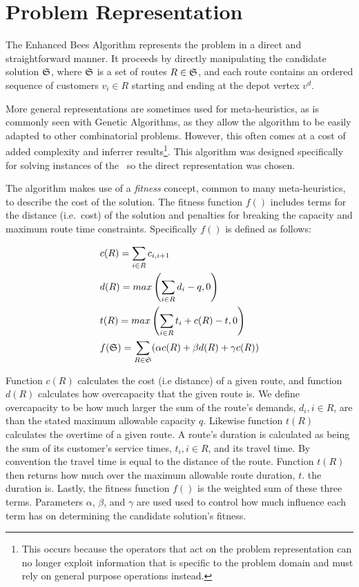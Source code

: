 \section{Problem Representation}
\label{sec:problemrepresentation}

The Enhanced Bees Algorithm represents the problem in a direct and straightforward manner. It proceeds by directly manipulating the candidate solution $\mathfrak{S}$, where $\mathfrak{S}$ is a set of routes $R \in \mathfrak{S}$, and each route contains an ordered sequence of customers $v_i \in R$ starting and ending at the depot vertex $v^d$.


More general representations are sometimes used for meta-heuristics, as is commonly seen with Genetic Algorithms, as they allow the algorithm to be easily adapted to other combinatorial problems. However, this often comes at a cost of added complexity and inferrer results\footnote{This occurs because the operators that act on the problem representation can no longer exploit information that is specific to the problem domain and must rely on general purpose operations instead.}. This algorithm was designed specifically for solving instances of the \VRP\ so the direct representation was chosen.

The algorithm makes use of a \emph{fitness} concept, common to many meta-heuristics, to describe the cost of the solution. The fitness function $f()$ includes terms for the distance (i.e.~cost) of the solution and penalties for breaking the capacity and maximum route time constraints. Specifically $f()$ is defined as follows:

\begin{align}
   & c(R) = \sum_{i \in R} c_{i, i+1} \\
   & d(R) = max\left( \sum_{i \in R} d_i - q, 0 \right)  \\
   & t(R) = max\left( \sum_{i \in R} t_i + c(R) - t, 0 \right)  \\
   & f(\mathfrak{S}) = \sum_{R \in \mathfrak{S}} (\alpha c(R) + \beta d(R) + \gamma c(R))
\end{align}

Function $c(R)$ calculates the cost (i.e distance) of a given route, and function $d(R)$ calculates how overcapacity that the given route is. We define overcapacity to be how much larger the sum of the route's demands, $d_i, i \in R$, are than the stated maximum allowable capacity $q$. Likewise function $t(R)$ calculates the overtime of a given route. A route's duration is calculated as being the sum of its customer's service times, $t_i, i \in R$, and its travel time. By convention the travel time is equal to the distance of the route. Function $t(R)$ then returns how much over the maximum allowable route duration, $t$. the duration is. Lastly, the fitness function $f()$ is the weighted sum of these three terms. Parameters $\alpha$, $\beta$, and $\gamma$ are used used to control how much influence each term has on determining the candidate solution's fitness.

